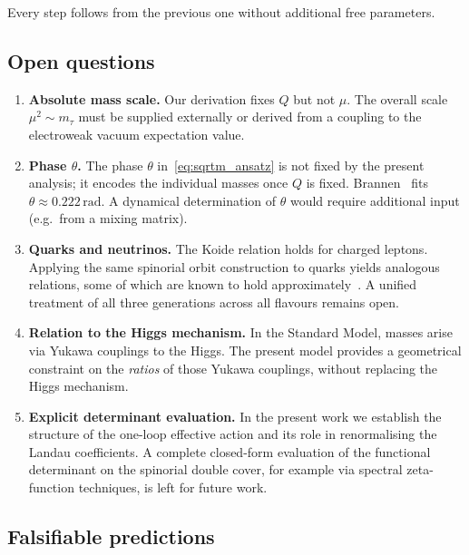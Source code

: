 \documentclass[12pt,a4paper]{article}
\theoremstyle{definition}
\begin{document}
Every step follows from the previous one without additional free parameters.

\subsection{Open questions}

\begin{enumerate}[label=(\roman*)]
  \item \textbf{Absolute mass scale.}
        Our derivation fixes $Q$ but not $\mu$.
        The overall scale $\mu^2 \sim m_\tau$ must be supplied externally or derived
        from a coupling to the electroweak vacuum expectation value.

  \item \textbf{Phase $\theta$.}
        The phase $\theta$ in~\eqref{eq:sqrtm_ansatz} is not fixed by the present
        analysis; it encodes the individual masses once $Q$ is fixed.
        Brannen~\cite{Brannen2006} fits $\theta \approx 0.222\,\mathrm{rad}$.
        A dynamical determination of $\theta$ would require additional input
        (e.g.\ from a mixing matrix).

  \item \textbf{Quarks and neutrinos.}
        The Koide relation holds for charged leptons.
        Applying the same spinorial orbit construction to quarks yields analogous
        relations, some of which are known to hold approximately~\cite{Foot1994}.
        A unified treatment of all three generations across all flavours remains open.

  \item \textbf{Relation to the Higgs mechanism.}
        In the Standard Model, masses arise via Yukawa couplings to the Higgs.
        The present model provides a geometrical constraint on the \emph{ratios}
        of those Yukawa couplings, without replacing the Higgs mechanism.

  \item \textbf{Explicit determinant evaluation.}
      In the present work we establish the structure of the one-loop
      effective action and its role in renormalising the Landau coefficients.
      A complete closed-form evaluation of the functional determinant
      on the spinorial double cover, for example via spectral
      zeta-function techniques, is left for future work.
\end{enumerate}

\subsection{Falsifiable predictions}
\end{document}
